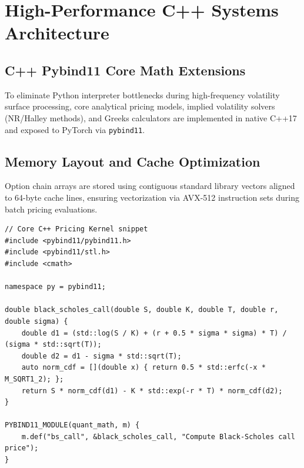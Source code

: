 \chapter{High-Performance C++ Systems Architecture}
\section{C++ Pybind11 Core Math Extensions}
To eliminate Python interpreter bottlenecks during high-frequency volatility surface processing, core analytical pricing models, implied volatility solvers (NR/Halley methods), and Greeks calculators are implemented in native C++17 and exposed to PyTorch via \texttt{pybind11}.

\section{Memory Layout and Cache Optimization}
Option chain arrays are stored using contiguous standard library vectors aligned to 64-byte cache lines, ensuring vectorization via AVX-512 instruction sets during batch pricing evaluations.

\begin{verbatim}
// Core C++ Pricing Kernel snippet
#include <pybind11/pybind11.h>
#include <pybind11/stl.h>
#include <cmath>

namespace py = pybind11;

double black_scholes_call(double S, double K, double T, double r, double sigma) {
    double d1 = (std::log(S / K) + (r + 0.5 * sigma * sigma) * T) / (sigma * std::sqrt(T));
    double d2 = d1 - sigma * std::sqrt(T);
    auto norm_cdf = [](double x) { return 0.5 * std::erfc(-x * M_SQRT1_2); };
    return S * norm_cdf(d1) - K * std::exp(-r * T) * norm_cdf(d2);
}

PYBIND11_MODULE(quant_math, m) {
    m.def("bs_call", &black_scholes_call, "Compute Black-Scholes call price");
}
\end{verbatim}
